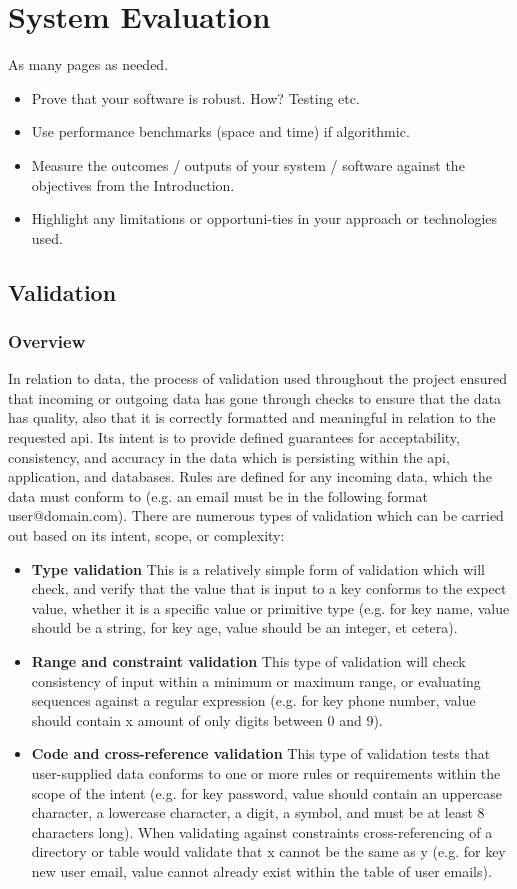 \chapter{System Evaluation}
As many pages as needed.
\begin{itemize}
\item Prove that your software is robust. How? Testing etc. 
\item Use performance benchmarks (space and time) if algorithmic.
\item Measure the outcomes / outputs of your system / software against the objectives from the Introduction.
\item Highlight any limitations or opportuni-ties in your approach or technologies used.
\end{itemize}

\section{Validation}
\subsection{Overview}
	In relation to data, the process of validation used throughout the project ensured that incoming or outgoing data has gone through checks to ensure that the data has quality, also that it is correctly formatted and meaningful in relation to the requested api. Its intent is to provide defined guarantees for acceptability, consistency, and accuracy in the data which is persisting within the api, application, and databases. Rules are defined for any incoming data, which the data must conform to (e.g. an email must be in the following format user@domain.com). There are numerous types of validation which can be carried out based on its intent, scope, or complexity:
	\begin{itemize}
	\item \textbf{Type validation} This is a relatively simple form of validation which will check, and verify that the value that is input to a key conforms to the expect value, whether it is a specific value or primitive type (e.g. for key name, value should be a string, for key age, value should be an integer, et cetera). 
    \item \textbf{Range and constraint validation} This type of validation will check consistency of input within a minimum or maximum range, or evaluating sequences against a regular expression (e.g. for key phone number, value should contain x amount of only digits between 0 and 9).
    \item \textbf{Code and cross-reference validation} This type of validation tests that user-supplied data conforms to one or more rules or requirements within the scope of the intent (e.g. for key password, value should contain an uppercase character, a lowercase character, a digit, a symbol, and must be at least 8 characters long). When validating against constraints cross-referencing of a directory or table would validate that x cannot be the same as y (e.g. for key new user email, value cannot already exist within the table of user emails).
	\end{itemize}

